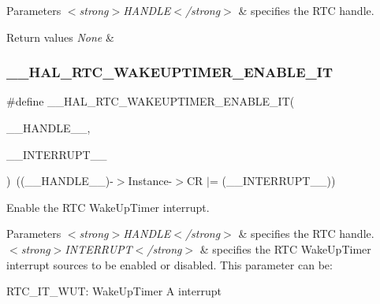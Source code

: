 \begin{DoxyParams}{Parameters}
{\em $<$strong$>$\+H\+A\+N\+D\+L\+E$<$/strong$>$} & specifies the R\+TC handle. \\
\hline
\end{DoxyParams}

\begin{DoxyRetVals}{Return values}
{\em None} & \\
\hline
\end{DoxyRetVals}
\mbox{\label{group___r_t_c_ex___wake_up___timer_gab02dbd4cbdcd1c544a5e45b37fad276b}} 
\subsubsection{\texorpdfstring{\+\_\+\+\_\+\+H\+A\+L\+\_\+\+R\+T\+C\+\_\+\+W\+A\+K\+E\+U\+P\+T\+I\+M\+E\+R\+\_\+\+E\+N\+A\+B\+L\+E\+\_\+\+IT}{\_\_HAL\_RTC\_WAKEUPTIMER\_ENABLE\_IT}}
{\footnotesize\ttfamily \#define \+\_\+\+\_\+\+H\+A\+L\+\_\+\+R\+T\+C\+\_\+\+W\+A\+K\+E\+U\+P\+T\+I\+M\+E\+R\+\_\+\+E\+N\+A\+B\+L\+E\+\_\+\+IT(\begin{DoxyParamCaption}\item[{}]{\+\_\+\+\_\+\+H\+A\+N\+D\+L\+E\+\_\+\+\_\+,  }\item[{}]{\+\_\+\+\_\+\+I\+N\+T\+E\+R\+R\+U\+P\+T\+\_\+\+\_\+ }\end{DoxyParamCaption})~((\+\_\+\+\_\+\+H\+A\+N\+D\+L\+E\+\_\+\+\_\+)-\/$>$Instance-\/$>$CR $\vert$= (\+\_\+\+\_\+\+I\+N\+T\+E\+R\+R\+U\+P\+T\+\_\+\+\_\+))}



Enable the R\+TC Wake\+Up\+Timer interrupt. 


\begin{DoxyParams}{Parameters}
{\em $<$strong$>$\+H\+A\+N\+D\+L\+E$<$/strong$>$} & specifies the R\+TC handle. \\
\hline
{\em $<$strong$>$\+I\+N\+T\+E\+R\+R\+U\+P\+T$<$/strong$>$} & specifies the R\+TC Wake\+Up\+Timer interrupt sources to be enabled or disabled. This parameter can be\+: \begin{DoxyItemize}
\item R\+T\+C\+\_\+\+I\+T\+\_\+\+W\+UT\+: Wake\+Up\+Timer A interrupt \end{DoxyItemize}
\\
\hline
\end{DoxyParams}

